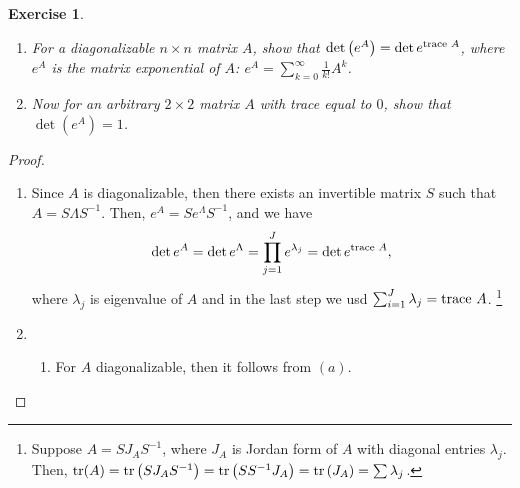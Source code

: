 \documentclass[11pt]{article}
\newtheorem{exercise}{Exercise}[section]
\theoremstyle{definition}
\numberwithin{equation}{subsection}
\begin{document}
\begin{exercise}
~\begin{enumerate}[label=(\alph*)]
    \item For a diagonalizable $n \times n$ matrix $A$, show that $\det \left(e^A\right) = \det e^{{\rm trace}\,\, A}$, where $e^A$ is the matrix exponential of $A$: $e^A = \sum^\infty_{k = 0} \frac{1}{k!} A^k$.
    
    \item Now for an arbitrary $2 \times 2$ matrix $A$ with trace equal to $0$, show that $\det \left(e^A\right) = 1$.
\end{enumerate}
\end{exercise}
\begin{proof}
~\begin{enumerate}[label=(\alph*)]
    \item Since $A$ is diagonalizable, then there exists an invertible matrix $S$ such that $A = S \Lambda S^{-1}$. Then, $e^A = S e^\Lambda S^{-1}$, and we have
    \begin{align*}
        \det e^A = \det e^\Lambda = \prod^J_{j=1} e^{\lambda_j} = \det e^{{\rm trace}\,\, A},
    \end{align*}
    where $\lambda_j$ is eigenvalue of $A$ and in the last step we usd $\sum^J_{i = 1} \lambda_j = {\rm trace}\,\, A$\cite{5}. \footnote{Suppose $A = S J_A S^{-1}$, where $J_A$ is Jordan form of $A$ with diagonal entries $\lambda_j$. Then, ${\rm tr} (A) = {\rm tr} \left(S J_A S^{-1} \right) = {\rm tr} \left(S S^{-1} J_A \right) = {\rm tr} \left(J_A \right) = \sum \lambda_j$.}
    
    \item \begin{enumerate}[label = \arabic*)]
        \item For $A$ diagonalizable, then it follows from $(a)$. 
        

\end{enumerate}
\end{enumerate}
\end{proof}
\end{document}
